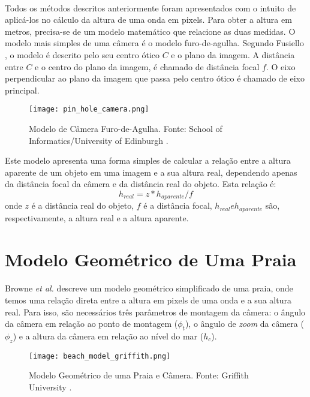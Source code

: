 \paragraph{}Todos os métodos descritos anteriormente foram apresentados com o intuito de aplicá-los no cálculo da altura de uma onda em pixels. Para obter a altura em metros, precisa-se de um modelo matemático que relacione as duas medidas. O modelo mais simples de uma câmera é o modelo furo-de-agulha. Segundo Fusiello \cite{Fusiello}, o modelo é descrito pelo seu centro ótico \(C\) e o plano da imagem. A distância entre \(C\) e o centro do plano da imagem, é chamado de distância focal \(f\). O eixo perpendicular ao plano da imagem que passa pelo centro ótico é chamado de eixo principal.
\begin{figure}[h]
\begin{center}
  \texttt{[image: pin\_hole\_camera.png]}
  \caption[\small{Modelo de Câmera Furo-de-Agulha. Fonte: School of Informatics/University of Edinburgh \cite{Fusiello}.}]{\label{FigFusiello} \small{Modelo de Câmera Furo-de-Agulha. Fonte: School of Informatics/University of Edinburgh \cite{Fusiello}.}}
\end{center}
\end{figure}
\noindent{}Este modelo apresenta uma forma simples de calcular a relação entre a altura aparente de um objeto em uma imagem e a sua altura real, dependendo apenas da distância focal da câmera e da distância real do objeto. Esta relação é:
\[
        h_{real} = z * h_{aparente} / f
\]
\noindent{}onde \(z\) é a distância real do objeto, \(f\) é a distância focal, \(h_{real} e h_{aparente}\) são, respectivamente, a altura real e a altura aparente.
\section{Modelo Geométrico de Uma Praia}
\paragraph{}Browne \textit{et al.} \cite{Griffith14} descreve um modelo geométrico simplificado de uma praia, onde temos uma relação direta entre a altura em pixels de uma onda e a sua altura real. Para isso, são necessários três parâmetros de montagem da câmera: o ângulo da câmera em relação ao ponto de montagem (\(\phi_{t}\)), o ângulo de \textit{zoom} da câmera (\(\phi_{z}\)) e a altura da câmera em relação ao nível do mar (\(h_{c}\)).
\begin{figure}[h]
\begin{center}
  \texttt{[image: beach\_model\_griffith.png]}
  \caption[\small{Modelo Geométrico de uma Praia e Câmera. Fonte: Griffith University \cite{Griffith14}.}]{\label{FigBeachModel} \small{Modelo Geométrico de uma Praia e Câmera. Fonte: Griffith University \cite{Griffith14}.}}
\end{center}
\end{figure}
